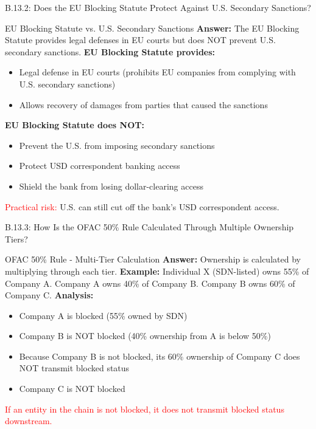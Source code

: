 \documentclass{beamer}
\begin{document}
	\begin{frame}{B.13.2: Does the EU Blocking Statute Protect Against U.S. Secondary Sanctions?}
		\begin{block}{EU Blocking Statute vs. U.S. Secondary Sanctions}
			\textbf{Answer:} The EU Blocking Statute provides legal defenses in EU courts but does NOT prevent U.S. secondary sanctions.
			\vspace{0.2cm}
			\textbf{EU Blocking Statute provides:}
			\begin{itemize}
				\item Legal defense in EU courts (prohibits EU companies from complying with U.S. secondary sanctions)
				\item Allows recovery of damages from parties that caused the sanctions
			\end{itemize}
			\textbf{EU Blocking Statute does NOT:}
			\begin{itemize}
				\item Prevent the U.S. from imposing secondary sanctions
				\item Protect USD correspondent banking access
				\item Shield the bank from losing dollar-clearing access
			\end{itemize}
			\textcolor{red}{Practical risk:} U.S. can still cut off the bank's USD correspondent access.
		\end{block}
	\end{frame}
	
	\begin{frame}{B.13.3: How Is the OFAC 50\% Rule Calculated Through Multiple Ownership Tiers?}
		\begin{block}{OFAC 50\% Rule - Multi-Tier Calculation}
			\textbf{Answer:} Ownership is calculated by multiplying through each tier.
			\vspace{0.2cm}
			\textbf{Example:} Individual X (SDN-listed) owns 55\% of Company A. Company A owns 40\% of Company B. Company B owns 60\% of Company C.
			\vspace{0.2cm}
			\textbf{Analysis:}
			\begin{itemize}
				\item Company A is blocked (55\% owned by SDN)
				\item Company B is NOT blocked (40\% ownership from A is below 50\%)
				\item Because Company B is not blocked, its 60\% ownership of Company C does NOT transmit blocked status
				\item Company C is NOT blocked
			\end{itemize}
			\textcolor{red}{If an entity in the chain is not blocked, it does not transmit blocked status downstream.}
		\end{block}
	\end{frame}
	
\end{document}
